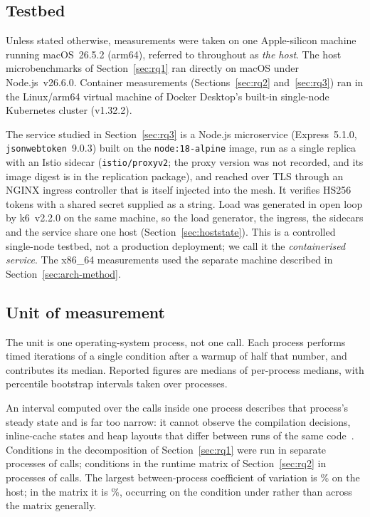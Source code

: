 \documentclass[preprint,12pt,authoryear]{elsarticle}
\newcommand{\LibraryName}{\texttt{jsonwebtoken}}
\begin{document}
\subsection{Testbed}\label{sec:testbed}

Unless stated otherwise, measurements were taken on one Apple-silicon machine
running macOS~26.5.2 (arm64), referred to throughout as \emph{the host}. The
host microbenchmarks of Section~\ref{sec:rq1} ran directly on macOS under
Node.js~v26.6.0. Container measurements (Sections~\ref{sec:rq2}
and~\ref{sec:rq3}) ran in the Linux/arm64 virtual machine of Docker Desktop's
built-in single-node Kubernetes cluster (v1.32.2).

The service studied in Section~\ref{sec:rq3} is a Node.js microservice
(Express~5.1.0, \LibraryName{}~9.0.3) built on the \texttt{node:18-alpine}
image, run as a single replica with an Istio sidecar
(\texttt{istio/proxyv2}; the proxy version was not recorded, and its image
digest is in the replication package), and reached over TLS through an NGINX
ingress controller that is itself injected into the mesh. It verifies HS256
tokens with a shared secret supplied as a string. Load was generated in open
loop by k6~v2.2.0 on the same machine, so the load generator, the ingress, the
sidecars and the service share one host (Section~\ref{sec:hoststate}). This is a
controlled single-node testbed, not a production deployment; we call it the
\emph{containerised service}. The x86\_64 measurements used the separate
machine described in Section~\ref{sec:arch-method}.

\subsection{Unit of measurement}\label{sec:unit}

The unit is one operating-system process, not one call. Each process performs
\HostCallsPerInvocation{} timed iterations of a single condition after a warmup
of half that number, and contributes its median. Reported figures are medians of
per-process medians, with percentile bootstrap intervals taken over processes.

An interval computed over the calls inside one process describes that process's
steady state and is far too narrow: it cannot observe the compilation decisions,
inline-cache states and heap layouts that differ between runs of the same
code~\citep{georges2007statistically}. Conditions in the decomposition of
Section~\ref{sec:rq1} were run in \HostInvocations{} separate processes of
\HostCallsPerInvocation{} calls; conditions in the runtime matrix of
Section~\ref{sec:rq2} in \MatrixInvocations{} processes of
\MatrixCallsPerInvocation{} calls. The largest between-process coefficient of
variation is \HostCvMax\% on the host; in the matrix it is \MatrixCvMax\%,
occurring on the \texttt{\MatrixCvMaxCondition} condition under
\texttt{\MatrixCvMaxEnvironment} rather than across the matrix generally.
\end{document}

